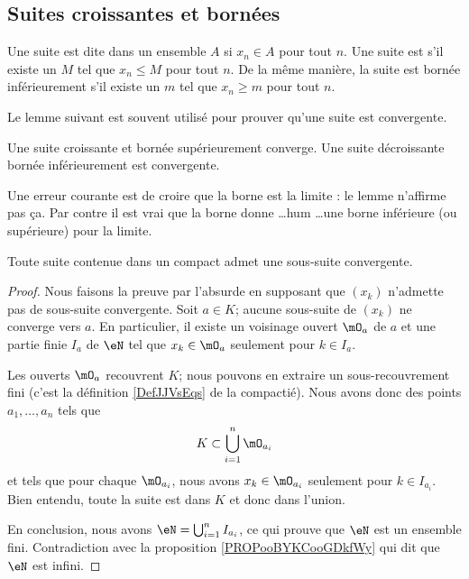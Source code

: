 \subsection{Suites croissantes et bornées}

Une suite est dite  dans un ensemble $A$ si $x_n\in A$ pour tout $n$. Une suite est  s'il existe un $M$ tel que $x_n\leq M$ pour tout $n$. De la même manière, la suite est bornée inférieurement s'il existe un $m$ tel que $x_n\geq m$ pour tout $n$.

Le lemme suivant est souvent utilisé pour prouver qu'une suite est convergente.
\begin{lemma}		\label{LemSuiteCrBorncv}
	Une suite croissante et bornée supérieurement converge. Une suite décroissante bornée inférieurement est convergente.
\end{lemma}

Une erreur courante est de croire que la borne est la limite : le lemme n'affirme pas ça. Par contre il est vrai que la borne donne \ldots hum \ldots une borne inférieure (ou supérieure) pour la limite.

\begin{theorem}     \label{THOooRDYOooJHLfGq}
    Toute suite contenue dans un compact admet une sous-suite convergente.
\end{theorem}

\begin{proof}
    Nous faisons la preuve par l'absurde en supposant que \( (x_k)\) n'admette pas de sous-suite convergente. Soit \( a\in K\); aucune sous-suite de \( (x_k)\) ne converge vers \( a\). En particulier, il existe un voisinage ouvert \( \mO_a\) de \( a\) et une partie finie \( I_a\) de \( \eN\) tel que \( x_k\in \mO_a\) seulement pour \( k\in I_a\).

    Les ouverts \( \mO_a\) recouvrent \( K\); nous pouvons en extraire un sous-recouvrement fini (c'est la définition \ref{DefJJVsEqs} de la compactié). Nous avons donc des points \( a_1,\ldots, a_n\) tels que 
    \begin{equation}
        K\subset \bigcup_{i=1}^n\mO_{a_i}
    \end{equation}
    et tels que pour chaque \( \mO_{a_i}\), nous avons \( x_k\in \mO_{a_i}\) seulement pour \( k\in I_{a_i}\). Bien entendu, toute la suite est dans \( K\) et donc dans l'union.

    En conclusion, nous avons \( \eN=\bigcup_{i=1}^n I_{a_i}\), ce qui prouve que \( \eN\) est un ensemble fini. Contradiction avec la proposition \ref{PROPooBYKCooGDkfWy} qui dit que \( \eN\) est infini.
\end{proof}

